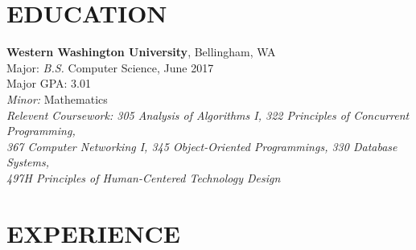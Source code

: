 \documentclass[line,margin]{res}
\begin{document}
\address{406.261.0065 $|$ alex@alex-benedetto.com $|$ https://linkedin.com/in/alex-benedetto $|$ github.com/wolfpack94}

\begin{resume}

\section{EDUCATION}
	{\bf Western Washington University}, Bellingham, WA \\
	Major: {\sl B.S.} Computer Science, {\small June 2017}\\
	Major GPA: 3.01\\
	{\sl Minor:} Mathematics\\
	{\sl Relevent Coursework: 305 {\small Analysis of Algorithms I}, 322 {\small Principles of Concurrent Programming},\\ 367 {\small Computer Networking I},
		 345 {\small Object-Oriented Programmings}, 330 {\small Database Systems},
		\\ 497H {\small Principles of Human-Centered Technology Design} }
\section{EXPERIENCE}


\end{resume}
\end{document}
